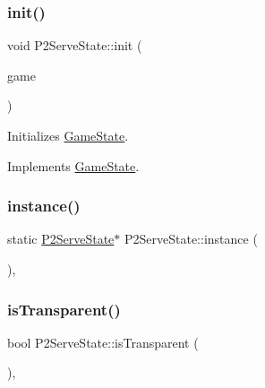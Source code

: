 \mbox{\label{class_p2_serve_state_a7f6cbb73e0d08949e3df08b97ba089f5}} 
\subsubsection{\texorpdfstring{init()}{init()}}
{\footnotesize\ttfamily void P2\+Serve\+State\+::init (\begin{DoxyParamCaption}\item[{\mbox{\hyperlink{class_game_engine}{Game\+Engine}} $\ast$}]{game }\end{DoxyParamCaption})\hspace{0.3cm}{\ttfamily [virtual]}}



Initializes \mbox{\hyperlink{class_game_state}{Game\+State}}. 



Implements \mbox{\hyperlink{class_game_state_a10b6e6bb31591c70d08ffcee5f29fa81}{Game\+State}}.

\mbox{\label{class_p2_serve_state_ab33721553cd862745bb721fcab45b104}} 
\subsubsection{\texorpdfstring{instance()}{instance()}}
{\footnotesize\ttfamily static \mbox{\hyperlink{class_p2_serve_state}{P2\+Serve\+State}}$\ast$ P2\+Serve\+State\+::instance (\begin{DoxyParamCaption}{ }\end{DoxyParamCaption})\hspace{0.3cm}{\ttfamily [inline]}, {\ttfamily [static]}}

\mbox{\label{class_p2_serve_state_a60e2072a070c980f8c9b9365a83041fd}} 
\subsubsection{\texorpdfstring{isTransparent()}{isTransparent()}}
{\footnotesize\ttfamily bool P2\+Serve\+State\+::is\+Transparent (\begin{DoxyParamCaption}{ }\end{DoxyParamCaption})\hspace{0.3cm}{\ttfamily [inline]}, {\ttfamily [virtual]}}



